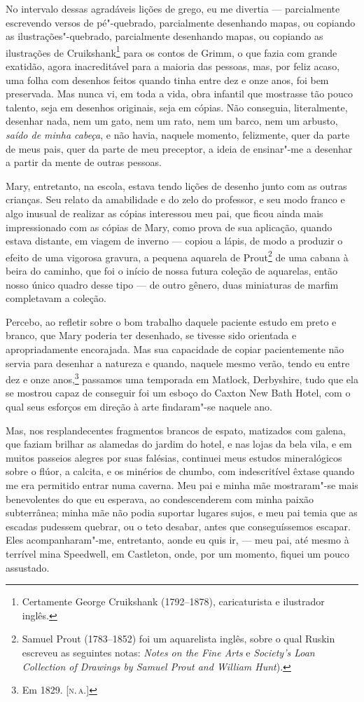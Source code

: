 No intervalo dessas agradáveis lições de grego, eu me divertia ---
parcialmente escrevendo versos de pé"-quebrado, parcialmente desenhando
mapas, ou copiando as ilustrações"-quebrado, parcialmente desenhando mapas,
ou copiando as
ilustrações
de Cruikshank\footnote{Certamente George Cruikshank (1792--1878), caricaturista e ilustrador inglês.} para os contos de
Grimm, o que fazia com grande exatidão, agora inacreditável para a
maioria das pessoas, mas, por feliz acaso, uma folha com desenhos feitos
quando tinha entre dez e onze anos, foi bem preservada. Mas nunca vi, em
toda a vida, obra infantil que mostrasse tão pouco talento, seja em
desenhos originais, seja em cópias. Não conseguia, literalmente,
desenhar nada, nem um gato, nem um rato, nem um barco, nem um arbusto,
\textit{saído de minha cabeça}, e não havia, naquele momento, felizmente,
quer da parte de meus pais, quer da parte de meu preceptor, a ideia de
ensinar"-me a desenhar a partir da mente de outras pessoas.

Mary, entretanto, na escola, estava tendo lições de desenho junto com as
outras crianças. Seu relato da amabilidade e do zelo do professor, e seu
modo franco e algo inusual de realizar as cópias interessou meu pai, que
ficou ainda mais impressionado com as cópias de Mary, como prova de sua
aplicação, quando estava distante, em viagem de inverno --- copiou a
lápis, de modo a produzir o efeito de uma vigorosa gravura, a pequena
aquarela de Prout\footnote{Samuel Prout (1783--1852) foi um aquarelista inglês,
  sobre o qual Ruskin escreveu as seguintes notas: \textit{Notes on the
  Fine Arts} e \textit{Society's Loan Collection of Drawings by Samuel Prout
  and William Hunt}).} de uma cabana à beira do caminho,
que foi o início de nossa futura coleção de aquarelas, então nosso único
quadro desse tipo --- de outro gênero, duas miniaturas de marfim
completavam a coleção.

Percebo, ao refletir sobre o bom trabalho daquele paciente estudo em
preto e branco, que Mary poderia ter desenhado, se tivesse sido
orientada e apropriadamente encorajada. Mas sua capacidade de copiar
pacientemente não servia para desenhar a natureza e quando, naquele
mesmo verão, tendo eu entre dez e onze anos,\footnote{Em 1829. {[}\textsc{n.\,a.}{]}} passamos uma
temporada em Matlock, Derbyshire, tudo que ela se mostrou capaz de
conseguir foi um esboço do Caxton New Bath Hotel, com o qual seus
esforços em direção à arte findaram"-se naquele ano.

Mas, nos resplandecentes fragmentos brancos de espato, matizados com
galena, que faziam brilhar as alamedas do jardim do hotel, e nas lojas
da bela vila, e em muitos passeios alegres por suas falésias, continuei
meus estudos mineralógicos sobre o flúor, a calcita, e os minérios de
chumbo, com indescritível êxtase quando me era permitido entrar numa
caverna. Meu pai e minha mãe mostraram"-se mais benevolentes do que eu
esperava, ao condescenderem com minha paixão subterrânea; minha mãe não
podia suportar lugares sujos, e meu pai temia que as escadas pudessem
quebrar, ou o teto desabar, antes que conseguíssemos escapar. Eles
acompanharam"-me, entretanto, aonde eu quis ir, --- meu pai, até mesmo à
terrível mina Speedwell, em Castleton, onde, por um momento, fiquei um
pouco assustado.

